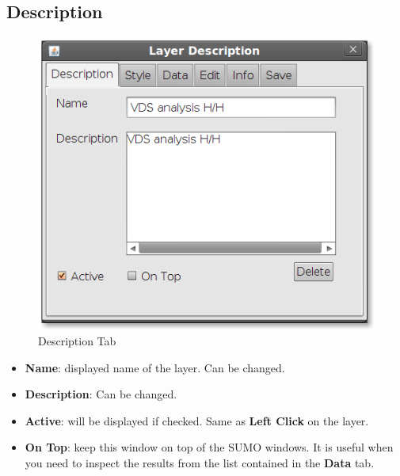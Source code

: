 \documentclass[12pt,a4paper,final]{report}
\begin{document}
\subsection{Description}
\begin{figure}[H]
 \centering
 \includegraphics[scale=0.45,keepaspectratio=true]{./images/VDS6.png}
 \caption{Description Tab}
\end{figure}
\begin{itemize}
 \item \textbf{Name}: displayed name of the layer. Can be changed.
 \item \textbf{Description}: Can be changed.
 \item \textbf{Active}: will be displayed if checked.
Same as \textbf{Left Click} on the layer.
 \item \textbf{On Top}: keep this window on top of the SUMO windows.
It is useful when you need to inspect the results from the list contained in the \textbf{Data} tab.
\end{itemize}
\end{document}
